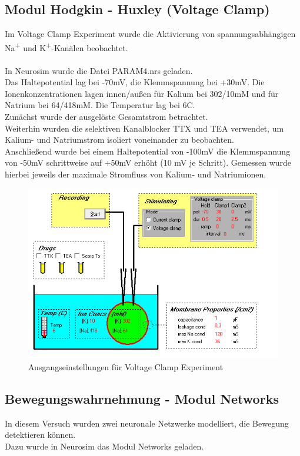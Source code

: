 \documentclass[a4paper]{article}
\begin{document}
\subsection{Modul Hodgkin - Huxley (Voltage Clamp)}
Im Voltage Clamp Experiment wurde die Aktivierung von spannungsabhängigen Na\textsuperscript{+} und K\textsuperscript{+}-Kanälen beobachtet.\\
\\
In Neurosim wurde die Datei PARAM4.nrs geladen.\\
Das Haltepotential lag bei -70mV, die Klemmspannung bei +30mV. Die Ionenkonzentrationen lagen innen/außen für Kalium bei 302/10mM und für Natrium bei 64/418mM. Die Temperatur lag bei 6\textdegree{}C.\\
Zunächst wurde der ausgelöste Gesamtstrom betrachtet.\\
Weiterhin wurden die selektiven Kanalblocker TTX und TEA verwendet, um Kalium- und Natriumstrom isoliert voneinander zu beobachten.\\
Anschließend wurde bei einem Haltepotential von -100mV die Klemmspannung von -50mV schrittweise auf +50mV erhöht (10 mV je Schritt). Gemessen wurde hierbei jeweils der maximale Stromfluss von Kalium- und Natriumionen.
\begin{figure}[H]
    \centering
    \includegraphics{images/Aufgabe3_1_Setup.png}
    \caption{Ausgangseinstellungen für Voltage Clamp Experiment}
    \label{fig:A3_1_Setup}
\end{figure}
\subsection{Bewegungswahrnehmung - Modul Networks}
In diesem Versuch wurden zwei neuronale Netzwerke modelliert, die Bewegung detektieren können.\\
Dazu wurde in Neurosim das Modul Networks geladen.
\end{document}

